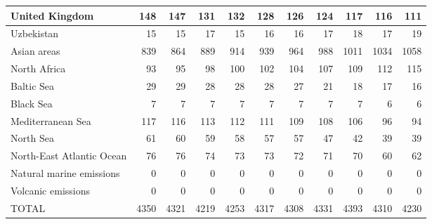 \begin{table}
\begin{tabular}{|l|r|r|r|r|r|r|r|r|r|r|}
                United Kingdom&    148&    147&    131&    132&    128&    126&    124&    117&    116&    111\\\hline
                    Uzbekistan&     15&     15&     17&     15&     16&     16&     17&     18&     17&     19\\\hline
                   Asian areas&    839&    864&    889&    914&    939&    964&    988&   1011&   1034&   1058\\\hline
                  North Africa&     93&     95&     98&    100&    102&    104&    107&    109&    112&    115\\\hline
                    Baltic Sea&     29&     29&     28&     28&     28&     27&     21&     18&     17&     16\\\hline
                     Black Sea&      7&      7&      7&      7&      7&      7&      7&      7&      6&      6\\\hline
             Mediterranean Sea&    117&    116&    113&    112&    111&    109&    108&    106&     96&     94\\\hline
                     North Sea&     61&     60&     59&     58&     57&     57&     47&     42&     39&     39\\\hline
     North-East Atlantic Ocean&     76&     76&     74&     73&     73&     72&     71&     70&     60&     62\\\hline
      Natural marine emissions&      0&      0&      0&      0&      0&      0&      0&      0&      0&      0\\\hline
            Volcanic emissions&      0&      0&      0&      0&      0&      0&      0&      0&      0&      0\\\hline\hline
                         TOTAL&   4350&   4321&   4219&   4253&   4317&   4308&   4331&   4393&   4310&   4230\\\hline
 \end{tabular}
 \end{table}
 
